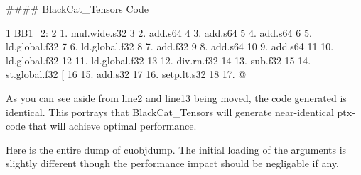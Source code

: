 \#\#\#\# Black\+Cat\+\_\+\+Tensors Code 
\begin{DoxyCode}
1 BB1\_2:
2 1. mul.wide.s32 %
3 2. add.s64 %
4 3. add.s64 %
5 4. add.s64 %
6 5. ld.global.f32 %
7 6. ld.global.f32 %
8 7. add.f32 %
9 8. add.s64 %
10 9. add.s64 %
11 10. ld.global.f32 %
12 11. ld.global.f32 %
13 12. div.rn.f32 %
14 13. sub.f32 %
15 14. st.global.f32 [%
16 15. add.s32 %
17 16. setp.lt.s32 %
18 17. @%
\end{DoxyCode}


As you can see aside from line2 and line13 being moved, the code generated is identical. This portrays that Black\+Cat\+\_\+\+Tensors will generate near-\/identical ptx-\/code that will achieve optimal performance.

Here is the entire dump of cuobjdump. The initial loading of the arguments is slightly different though the performance impact should be negligable if any.

